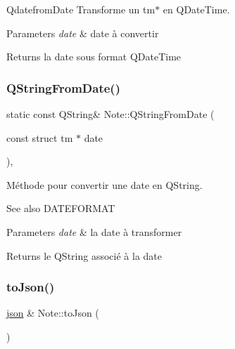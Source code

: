 Qdatefrom\+Date Transforme un tm$\ast$ en Q\+Date\+Time. 


\begin{DoxyParams}{Parameters}
{\em date} & date à convertir \\
\hline
\end{DoxyParams}
\begin{DoxyReturn}{Returns}
la date sous format Q\+Date\+Time 
\end{DoxyReturn}
\mbox{\label{classNote_acee08a412ed39b96daac7f8391b375bf}} 
\subsubsection{\texorpdfstring{Q\+String\+From\+Date()}{QStringFromDate()}}
{\footnotesize\ttfamily static const Q\+String\& Note\+::\+Q\+String\+From\+Date (\begin{DoxyParamCaption}\item[{const struct tm $\ast$}]{date }\end{DoxyParamCaption})\hspace{0.3cm}{\ttfamily [inline]}, {\ttfamily [static]}}



Méthode pour convertir une date en Q\+String. 

\begin{DoxySeeAlso}{See also}
D\+A\+T\+E\+F\+O\+R\+M\+AT 
\end{DoxySeeAlso}

\begin{DoxyParams}{Parameters}
{\em date} & la date à transformer \\
\hline
\end{DoxyParams}
\begin{DoxyReturn}{Returns}
le Q\+String associé à la date 
\end{DoxyReturn}
\mbox{\label{classNote_ac5bd9736feb45b144795d7ef1fc6a1ae}} 
\subsubsection{\texorpdfstring{to\+Json()}{toJson()}}
{\footnotesize\ttfamily \hyperlink{classnlohmann_1_1basic__json}{json} \& Note\+::to\+Json (\begin{DoxyParamCaption}{ }\end{DoxyParamCaption})\hspace{0.3cm}{\ttfamily [virtual]}}



